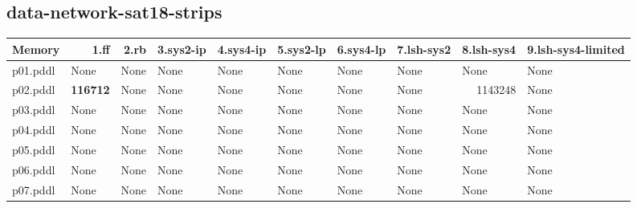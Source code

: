 \documentclass{article}
\begin{document}
\hypertarget{memory-data-network-sat18-strips}{}
\subsection*{data-network-sat18-strips}

\begin{tabular}{@{}lrrrrrrrrr@{}}
Memory & 1.ff & 2.rb & 3.sys2-ip & 4.sys4-ip & 5.sys2-lp & 6.sys4-lp & 7.lsh-sys2 & 8.lsh-sys4 & 9.lsh-sys4-limited \\
\midrule
p01.pddl & \multicolumn{1}{|l|}{None} & \multicolumn{1}{|l|}{None} & \multicolumn{1}{|l|}{None} & \multicolumn{1}{|l|}{None} & \multicolumn{1}{|l|}{None} & \multicolumn{1}{|l|}{None} & \multicolumn{1}{|l|}{None} & \multicolumn{1}{|l|}{None} & \multicolumn{1}{|l|}{None} \\
p02.pddl & \textbf{116712} & \multicolumn{1}{|l|}{None} & \multicolumn{1}{|l|}{None} & \multicolumn{1}{|l|}{None} & \multicolumn{1}{|l|}{None} & \multicolumn{1}{|l|}{None} & \multicolumn{1}{|l|}{None} & 1143248 & \multicolumn{1}{|l|}{None} \\
p03.pddl & \multicolumn{1}{|l|}{None} & \multicolumn{1}{|l|}{None} & \multicolumn{1}{|l|}{None} & \multicolumn{1}{|l|}{None} & \multicolumn{1}{|l|}{None} & \multicolumn{1}{|l|}{None} & \multicolumn{1}{|l|}{None} & \multicolumn{1}{|l|}{None} & \multicolumn{1}{|l|}{None} \\
p04.pddl & \multicolumn{1}{|l|}{None} & \multicolumn{1}{|l|}{None} & \multicolumn{1}{|l|}{None} & \multicolumn{1}{|l|}{None} & \multicolumn{1}{|l|}{None} & \multicolumn{1}{|l|}{None} & \multicolumn{1}{|l|}{None} & \multicolumn{1}{|l|}{None} & \multicolumn{1}{|l|}{None} \\
p05.pddl & \multicolumn{1}{|l|}{None} & \multicolumn{1}{|l|}{None} & \multicolumn{1}{|l|}{None} & \multicolumn{1}{|l|}{None} & \multicolumn{1}{|l|}{None} & \multicolumn{1}{|l|}{None} & \multicolumn{1}{|l|}{None} & \multicolumn{1}{|l|}{None} & \multicolumn{1}{|l|}{None} \\
p06.pddl & \multicolumn{1}{|l|}{None} & \multicolumn{1}{|l|}{None} & \multicolumn{1}{|l|}{None} & \multicolumn{1}{|l|}{None} & \multicolumn{1}{|l|}{None} & \multicolumn{1}{|l|}{None} & \multicolumn{1}{|l|}{None} & \multicolumn{1}{|l|}{None} & \multicolumn{1}{|l|}{None} \\
p07.pddl & \multicolumn{1}{|l|}{None} & \multicolumn{1}{|l|}{None} & \multicolumn{1}{|l|}{None} & \multicolumn{1}{|l|}{None} & \multicolumn{1}{|l|}{None} & \multicolumn{1}{|l|}{None} & \multicolumn{1}{|l|}{None} & \multicolumn{1}{|l|}{None} & \multicolumn{1}{|l|}{None} \\

\end{tabular}
\end{document}
